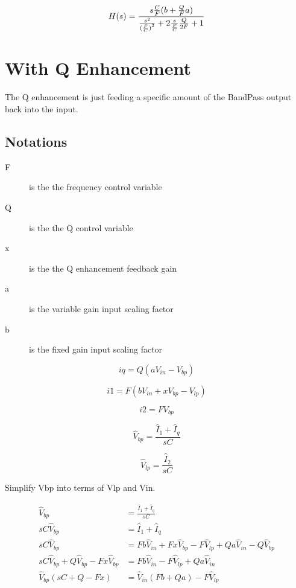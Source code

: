 \documentclass{article}
\begin{document}
\begin{equation}
  H(s) = \frac{s\frac{C}{F}{(b + \frac{Q}{F}a)}}{\frac{s^2}{{(\frac{F}{C})}^2} + 2\frac{s}{\frac{F}{C}}\frac{Q}{2F} + 1} \\
\end{equation}

\section{With Q Enhancement}

The Q enhancement is just feeding a specific amount of the BandPass output back into the input.

\subsection{Notations}

\begin{description}
\item[F] is the the frequency control variable
\item[Q] is the the Q control variable
\item[x] is the the Q enhancement feedback gain
\item[a] is the variable gain input scaling factor
\item[b] is the fixed gain input scaling factor
\end{description}

\begin{equation}
  iq = Q(aV_{in} - V_{bp})
\end{equation}

\begin{equation}
  i1 = F(bV_{in} + xV_{bp} - V_{lp})
\end{equation}

\begin{equation}
  i2 = FV_{bp}
\end{equation}

\begin{equation}
  \hat{V}_{bp} = \frac{\hat{I}_1 + \hat{I}_q}{sC}
\end{equation}

\begin{equation}
  \hat{V}_{lp} = \frac{\hat{I}_2}{sC}
\end{equation}

Simplify Vbp into terms of Vlp and Vin.

\begin{equation*}
\begin{split}
  \hat{V}_{bp} & = \frac{\hat{I}_1 + \hat{I}_q}{sC} \\
  sC\hat{V}_{bp} & = \hat{I}_1 + \hat{I}_q \\
  sC\hat{V}_{bp} & = Fb\hat{V}_{in} + Fx\hat{V}_{bp} - F\hat{V}_{lp} + Qa\hat{V}_{in} - Q\hat{V}_{bp} \\
  sC\hat{V}_{bp} + Q\hat{V}_{bp} - Fx\hat{V}_{bp} & = Fb\hat{V}_{in} - F\hat{V}_{lp} + Qa\hat{V}_{in}\\
  \hat{V}_{bp}(sC + Q - Fx) & = \hat{V}_{in}(Fb + Qa) - F\hat{V}_{lp} \\
\end{split}
\end{equation*}
\end{document}
